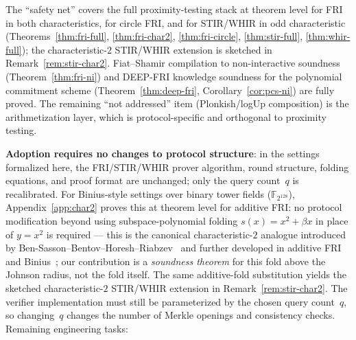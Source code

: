 \documentclass[11pt]{article}
\newcommand{\FF}{\mathbb{F}}
\begin{document}
The ``safety net'' covers the full proximity-testing stack at theorem level for FRI in both characteristics, for circle FRI, and for STIR/WHIR in odd characteristic (Theorems~\ref{thm:fri-full}, \ref{thm:fri-char2}, \ref{thm:fri-circle}, \ref{thm:stir-full}, \ref{thm:whir-full}); the characteristic-$2$ STIR/WHIR extension is sketched in Remark~\ref{rem:stir-char2}. Fiat--Shamir compilation to non-interactive soundness (Theorem~\ref{thm:fri-ni}) and DEEP-FRI knowledge soundness for the polynomial commitment scheme (Theorem~\ref{thm:deep-fri}, Corollary~\ref{cor:pcs-ni}) are fully proved. The remaining ``not addressed'' item (Plonkish/logUp composition) is the arithmetization layer, which is protocol-specific and orthogonal to proximity testing.

\noindent\textbf{Adoption requires no changes to protocol structure}: in the settings formalized here, the FRI/STIR/WHIR prover algorithm, round structure, folding equations, and proof format are unchanged; only the query count~$q$ is recalibrated. For Binius-style settings over binary tower fields ($\FF_{2^{128}}$), Appendix~\ref{app:char2} proves this at theorem level for additive FRI: no protocol modification beyond using subspace-polynomial folding $s(x) = x^2 + \beta x$ in place of $y = x^2$ is required --- this is the canonical characteristic-$2$ analogue introduced by Ben-Sasson--Bentov--Horesh--Riabzev~\cite{BBHR} and further developed in additive FRI and Binius~\cite{FRIBinius}; our contribution is a \emph{soundness theorem} for this fold above the Johnson radius, not the fold itself. The same additive-fold substitution yields the sketched characteristic-$2$ STIR/WHIR extension in Remark~\ref{rem:stir-char2}. The verifier implementation must still be parameterized by the chosen query count~$q$, so changing~$q$ changes the number of Merkle openings and consistency checks. Remaining engineering tasks:
\end{document}
